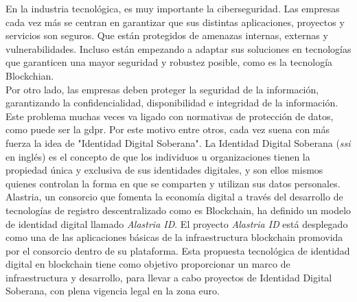 
En la industria tecnológica, es muy importante la ciberseguridad. Las empresas cada vez más se centran en garantizar que sus distintas aplicaciones, proyectos y servicios son seguros. Que están protegidos de amenazas internas, externas y vulnerabilidades. Incluso están empezando a adaptar sus soluciones en tecnologías que garanticen una mayor seguridad y robustez posible, como es la tecnología Blockchian.\\

Por otro lado, las empresas deben proteger la seguridad de la información, garantizando la confidencialidad, disponibilidad e integridad de la información. Este problema muchas veces va ligado con normativas de protección de datos, como puede ser la \acrshort{gdpr}. Por este motivo entre otros, cada vez suena con más fuerza la idea de "Identidad Digital Soberana". La Identidad Digital Soberana (\textit{\acrlong{ssi}} en inglés) es el concepto de que los individuos u organizaciones tienen la propiedad única y exclusiva de sus identidades digitales, y son ellos mismos quienes controlan la forma en que se comparten y utilizan sus datos personales.\\

Alastria, un consorcio que fomenta la economía digital a través del desarrollo de tecnologías de registro descentralizado como es Blockchain, ha definido un modelo de identidad digital llamado \textit{Alastria ID}. El proyecto \textit{Alastria ID} está desplegado como una de las aplicaciones básicas de la infraestructura blockchain promovida por el consorcio dentro de su plataforma. Esta propuesta tecnológica de identidad digital en blockchain tiene como objetivo proporcionar un marco de infraestructura y desarrollo, para llevar a cabo proyectos de Identidad Digital Soberana, con plena vigencia legal en la zona euro.\\


